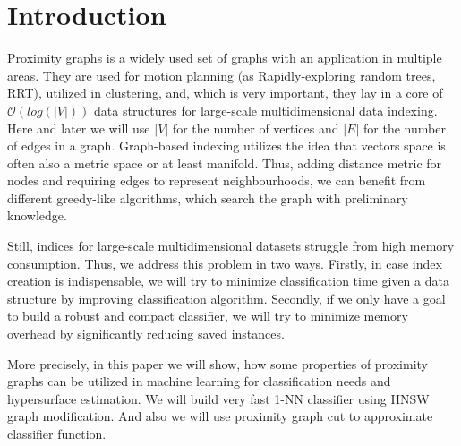 \section{Introduction}\label{sec:INTRO}

Proximity graphs is a widely used set of graphs with an application in multiple areas.
They are used for motion planning (as Rapidly-exploring random trees, RRT), utilized in clustering, and, which is very important, they lay in a core of $\mathcal{O}(log(|V|))$ data structures for large-scale multidimensional data indexing. Here and later we will use $|V|$ for the number of vertices and $|E|$ for the number of edges in a graph.
Graph-based indexing utilizes the idea that vectors space is often also a metric space or at least manifold.
Thus, adding distance metric for nodes and requiring edges to represent neighbourhoods, we can benefit from different greedy-like algorithms, which search the graph with preliminary knowledge.

Still, indices for large-scale multidimensional datasets struggle from high memory consumption. Thus, we address this problem in two ways. Firstly, in case index creation is indispensable, we will try to minimize classification time given a data structure by improving classification algorithm. Secondly, if we only have a goal to build a robust and compact classifier, we will try to minimize memory overhead by significantly reducing saved instances.

More precisely, in this paper we will show, how some properties of proximity graphs can be utilized in machine learning for classification needs and hypersurface estimation. We will build very fast 1-NN classifier using HNSW graph modification. And also we will use proximity graph cut to approximate classifier function.



